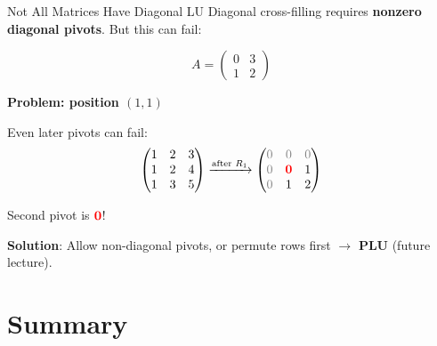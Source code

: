 \documentclass[10pt]{beamer}
\theoremstyle{definition}
\newcommand{\pvt}[1]{{\color{red}\mathbf{#1}}}       %
\newcommand{\rem}[1]{{\color{gray}#1}}                %
\newcommand{\x}[1]{\alert{\textbf{#1}}}
\begin{document}
\begin{frame}[fragile]{Not All Matrices Have Diagonal LU}
Diagonal cross-filling requires \x{nonzero diagonal pivots}. But this can fail:

$$A = \begin{pmatrix} 0 & 3 \\ 1 & 2 \end{pmatrix}$$

\textbf{Problem: position $(1,1)$}

\begin{center}
\end{center}

Even later pivots can fail:
$$\begin{pmatrix} 1 & 2 & 3 \\ 1 & 2 & 4 \\ 1 & 3 & 5 \end{pmatrix}
\xrightarrow{\text{after } R_1} \begin{pmatrix}
\rem{0} & \rem{0} & \rem{0} \\
\rem{0} & \pvt{0} & 1 \\
\rem{0} & 1 & 2
\end{pmatrix}$$

Second pivot is $\pvt{0}$!

\vspace{0.2cm}
\textbf{Solution}: Allow non-diagonal pivots, or permute rows first $\to$ \x{PLU} (future lecture).
\end{frame}

\section{Summary}
\end{document}
